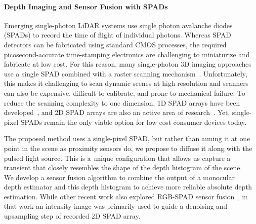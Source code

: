 \paragraph{Depth Imaging and Sensor Fusion with SPADs}
%
Emerging single-photon LiDAR systems use single photon avalanche diodes (SPADs) to record the time of flight of individual photons. Whereas SPAD detectors can be fabricated using standard CMOS processes, the required picosecond-accurate time-stamping electronics are challenging to miniaturize and fabricate at low cost. For this reason, many single-photon 3D imaging approaches use a single SPAD combined with a raster scanning mechanism~\cite{Lamb2010,Kirmani:2014,pawlikowska2017single,Li:2019}. Unfortunately, this makes it challenging to scan dynamic scenes at high resolution and scanners can also be expensive, difficult to calibrate, and prone to mechanical failure. To reduce the scanning complexity to one dimension, 1D SPAD arrays have been developed~\cite{burri2016linospad,burri2017linospad,OToole2017}, and 2D SPAD arrays are also an active area of research~\cite{Niclass2005,Stoppa2007,Veerappan2011,Zhang2018}. Yet, single-pixel SPADs remain the only viable option for low cost consumer devices today.

The proposed method uses a single-pixel SPAD, but rather than aiming it at one point in the scene as proximity sensors do, we propose to diffuse it along with the pulsed light source. This is a unique configuration that allows us capture a transient that closely resembles the shape of the depth histogram of the scene. We develop a sensor fusion algorithm to combine the output of a monocular depth estimator and this depth histogram to achieve more reliable absolute depth estimation. While other recent work also explored RGB-SPAD sensor fusion~\cite{Lindell2018}, in that work an intensity image was primarily used to guide a denoising and upsampling step of recorded 2D SPAD array.
 

